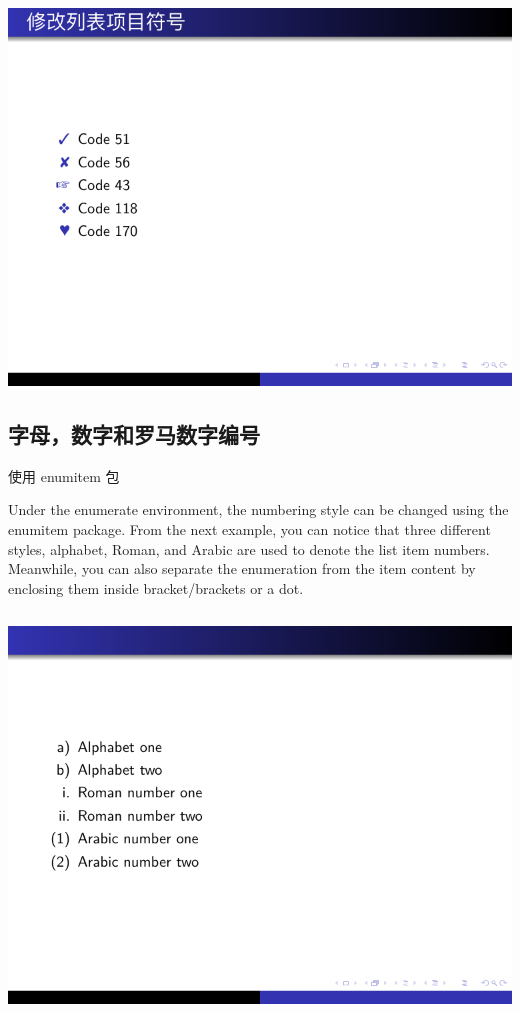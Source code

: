 \includegraphics{examples/beamer/list-item-marker2.pdf}

\subsection{字母，数字和罗马数字编号}

使用 enumitem 包

Under the enumerate environment, the numbering style can be changed using the enumitem package. From the next example, you can notice that three different styles, alphabet, Roman, and Arabic are used to denote the list item numbers. Meanwhile, you can also separate the enumeration from the item content by enclosing them inside bracket/brackets or a dot.

\inputminted[linenos=true]{latex}{examples/beamer/list-enumitem-label.tex}

\includegraphics{examples/beamer/list-enumitem-label.pdf}

